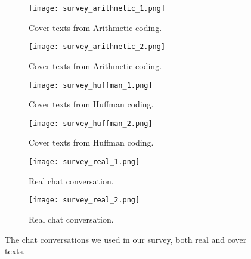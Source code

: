 \begin{figure}
	\captionsetup{width=\linewidth}

	\begin{subfigure}{0.3\linewidth}
		\centering
		\texttt{[image: survey\_arithmetic\_1.png]}
		\caption{Cover texts from Arithmetic coding.}
		\label{fig:surveyArithmetic1}
	\end{subfigure}
	\hfill
	\begin{subfigure}{0.3\linewidth}
		\centering
		\texttt{[image: survey\_arithmetic\_2.png]}
		\caption{Cover texts from Arithmetic coding.}
		\label{fig:surveyArithmetic2}
	\end{subfigure}
	\hfill
	\begin{subfigure}{0.3\linewidth}
		\centering
		\texttt{[image: survey\_huffman\_1.png]}
		\caption{Cover texts from Huffman coding.}
		\label{fig:surveyHuffman1}
	\end{subfigure}

	\begin{subfigure}{0.3\linewidth}
		\centering
		\texttt{[image: survey\_huffman\_2.png]}
		\caption{Cover texts from Huffman coding.}
		\label{fig:surveyHuffman2}
	\end{subfigure}
	\hfill
	\begin{subfigure}{0.3\linewidth}
		\centering
		\texttt{[image: survey\_real\_1.png]}
		\caption{Real chat conversation.}
		\label{fig:surveyReal1}
	\end{subfigure}
	\hfill
	\begin{subfigure}{0.3\linewidth}
		\centering
		\texttt{[image: survey\_real\_2.png]}
		\caption{Real chat conversation.}
		\label{fig:surveyReal2}
	\end{subfigure}

	\caption[Survey: Chats]{The chat conversations we used in our survey, both real and cover texts.}
	\label{fig:survey}
\end{figure}

